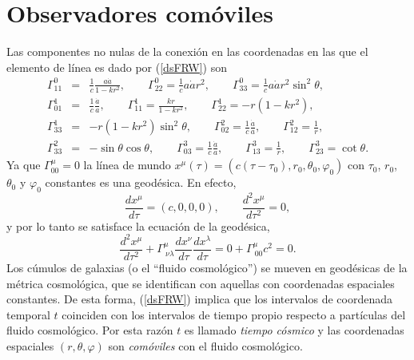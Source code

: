 \section{Observadores comóviles}
Las componentes no nulas de la conexión en las coordenadas en las que el elemento de línea es dado por (\ref{dsFRW}) son
\begin{eqnarray} 
 \Gamma^0_{11}&=&\frac{1}{c}\frac{a\dot{a}}{1-kr^2}, \qquad \Gamma^0_{22}=\frac{1}{c}a\dot{a}r^{2}, \qquad 
\Gamma^0_{33}=\frac{1}{c}a\dot{a}r^2\sin^2\theta ,\\
\Gamma^1_{01}&=&\frac{1}{c}\frac{\dot{a}}{a}, \qquad \Gamma^1_{11}=\frac{kr}{1-kr^2}, \qquad
\Gamma^1_{22}=-r(1-kr^2),\\
 \Gamma^1_{33}&=&-r(1-kr^2)\sin^2\theta, \qquad \Gamma^2_{02}=\frac{1}{c}\frac{\dot{a}}{a}, \qquad
\Gamma^2_{12}=\frac{1}{r}, \\
\Gamma^2_{33}&=&-\sin\theta\cos\theta, \qquad \Gamma^3_{03}=\frac{1}{c}\frac{\dot{a}}{a}, \qquad
\Gamma^3_{13}=\frac{1}{r}, \qquad
\Gamma^3_{23}=\cot\theta .
\end{eqnarray}
Ya que $\Gamma^\mu_{00}=0$ la línea de mundo $x^\mu(\tau)=(c(\tau-\tau_0),r_0,\theta_0,\varphi_0)$ con $\tau_0$, $r_0$, $\theta_0$ y $\varphi_0$ constantes es una geodésica. En efecto,
\begin{equation}
\frac{dx^\mu}{d\tau}=(c,0,0,0), \qquad   \frac{d^2x^\mu}{d\tau^2}=0,
\end{equation}
y por lo tanto se satisface la ecuación de la geodésica,
\begin{equation}
 \frac{d^2x^\mu}{d\tau^2}+\Gamma^\mu_{\ \nu\lambda}\frac{dx^\nu}{d\tau}\frac{dx^\lambda}{d\tau}=0+\Gamma^\mu_{\ 00}c^2=0.
\end{equation}
Los cúmulos de galaxias (o el ``fluido cosmológico'') se mueven en geodésicas de la métrica cosmológica,
que se identifican con aquellas con coordenadas espaciales constantes. De esta forma, (\ref{dsFRW}) implica que los
intervalos de coordenada temporal $t$ coinciden con los intervalos de tiempo propio respecto a partículas del fluido
cosmológico. Por esta razón $t$ es llamado \textit{tiempo cósmico} y las coordenadas espaciales $(r,\theta,\varphi)$
son \textit{comóviles} con el fluido cosmológico.
